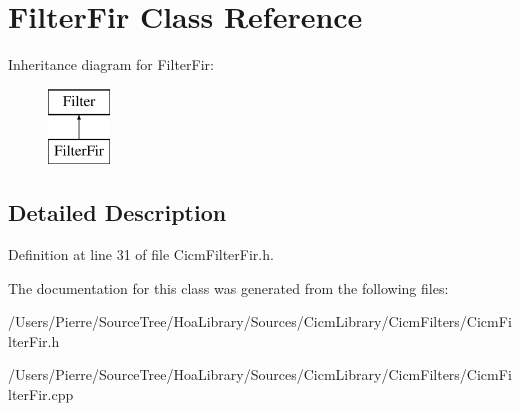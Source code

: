 \hypertarget{class_filter_fir}{\section{Filter\-Fir Class Reference}
\label{class_filter_fir}
}
Inheritance diagram for Filter\-Fir\-:\begin{figure}[H]
\begin{center}
\leavevmode
\includegraphics[height=2.000000cm]{class_filter_fir}
\end{center}
\end{figure}


\subsection{Detailed Description}


Definition at line 31 of file Cicm\-Filter\-Fir.\-h.



The documentation for this class was generated from the following files\-:\begin{DoxyCompactItemize}
\item 
/\-Users/\-Pierre/\-Source\-Tree/\-Hoa\-Library/\-Sources/\-Cicm\-Library/\-Cicm\-Filters/Cicm\-Filter\-Fir.\-h\item 
/\-Users/\-Pierre/\-Source\-Tree/\-Hoa\-Library/\-Sources/\-Cicm\-Library/\-Cicm\-Filters/Cicm\-Filter\-Fir.\-cpp\end{DoxyCompactItemize}
